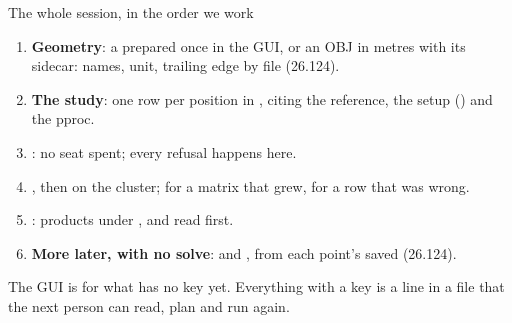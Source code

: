 \begin{frame}{The whole session, in the order we work}
\begin{enumerate}\small
  \item \textbf{Geometry}: a  prepared once in the GUI, or an OBJ in
        metres with its sidecar: names, unit, trailing edge by file (26.124).
  \item \textbf{The study}: one row per position in , citing
        the reference, the setup () and the pproc.
  \item {}: no seat spent; every refusal happens here.
  \item {}, then  on the cluster;
         for a matrix that grew,  for a row
        that was wrong.
  \item {}: products under , and
         read first.
  \item \textbf{More later, with no solve}:  and
        , from each point's saved 
        (26.124).
\end{enumerate}
\begin{takeaway}
The GUI is for what has no key yet. Everything with a key is a line in a file
that the next person can read, plan and run again.
\end{takeaway}
\end{frame}
